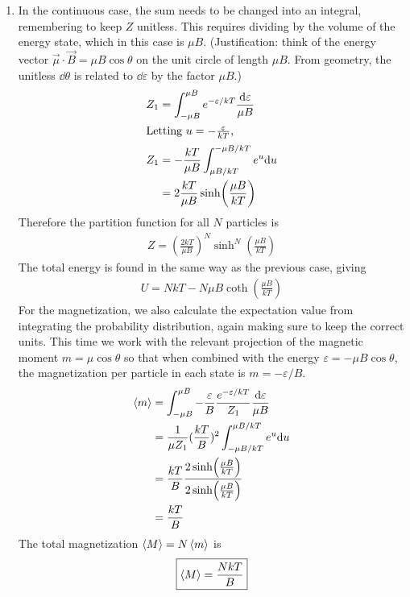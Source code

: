 \begin{enumerate}
	\item
		In the continuous case, the sum needs to be changed into an integral,
		remembering to keep $Z$ unitless. This requires dividing by the volume
		of the energy state, which in this case is ${\mu} B$. (Justification: think
		of the energy vector $\vec {\mu}\cdot \vec B = {\mu} B\cos \theta $ on the unit circle
		of length ${\mu} B$. From geometry, the unitless $\dd \theta $ is related to
		$\dd \varepsilon $ by the factor ${\mu} B$.)
		\begin{align*}
			Z_1 &= \int_{-{\mu} B}^{{\mu} B} e^{-\varepsilon /kT} \frac{\dd \varepsilon }{{\mu} B} \\
		\intertext{Letting $u = -\frac{\varepsilon }{kT}$,}
			Z_1 &= -\frac{kT}{{\mu} B} \int_{{\mu} B/kT}^{-{\mu} B/kT} e^u \dd u \\
			{} &= 2 \frac{kT}{{\mu} B} \sinh (\frac{{\mu} B}{kT})
		\end{align*}
		Therefore the partition function for all $N$ particles is
		\begin{align}
			\boxed{
			Z = (\frac{2kT}{{\mu} B})^N \sinh^N(\frac{{\mu} B}{kT})
			}
		\end{align}
		The total energy is found in the same way as the previous case, giving
		\begin{align}
			\boxed{
			U = NkT - N{\mu} B \coth (\frac{{\mu} B}{kT})
			}
		\end{align}
		For the magnetization, we also calculate the expectation value from
		integrating the probability distribution, again making sure to keep
		the correct units. This time we work with the relevant projection of
		the magnetic moment $m = {\mu}\cos \theta $ so that when combined with the energy
		$\varepsilon  = -{\mu} B\cos \theta $, the magnetization per particle in each state is $m =
		-\varepsilon /B$.
		\begin{align*}
			\expval{m} &= \int_{-{\mu} B}^{{\mu} B} -\frac{\varepsilon }{B} \frac{e^{-\varepsilon /kT}}{Z_1}
				\frac{\dd \varepsilon }{{\mu} B} \\
			{} &= \frac{1}{{\mu}Z_1}(\frac{kT}{B})^2 \int_{-{\mu} B/kT}^{{\mu} B/kT} e^u \dd u \\
			{} &= \frac{kT}{B} \frac{2\sinh(\frac{{\mu} B}{kT})}
				{2\sinh(\frac{{\mu} B}{kT})} \\
			{} &= \frac{kT}{B}
		\end{align*}
		The total magnetization $\expval{M} = N\expval{m}$ is
		\begin{align}
			\boxed{
			\expval{M} = \frac{NkT}{B}
			}
		\end{align}

\end{enumerate}
